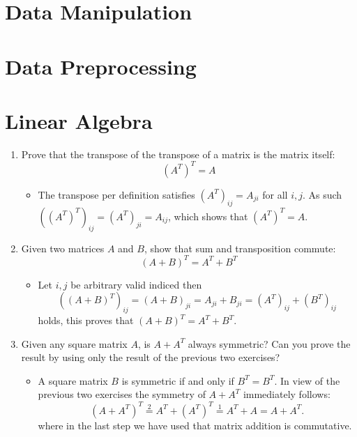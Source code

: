 \documentclass{article}
\begin{document}
\tableofcontents

\section{Data Manipulation}

\section{Data Preprocessing}

\section{Linear Algebra}
\begin{enumerate}
    \item Prove that the transpose of the transpose of a matrix is the matrix itself: \\
    $$(A^T)^T = A$$
    	\begin{itemize}
    		\item The transpose per definition satisfies $(A^T)_{ij} = A_{ji}$ for all $i, j$. As such $((A^T)^T)_{ij} = (A^T)_{ji} = A_{ij}$, which shows that $(A^T)^T = A$.
    	\end{itemize}

    \item Given two matrices $A$ and $B$, show that sum and transposition commute: \\
    $$(A + B)^T = A^T + B^T$$
    	\begin{itemize}
    		\item Let $i, j$ be arbitrary valid indiced then
    		$$((A + B)^T)_{ij} = (A + B)_{ji} = A_{ji} + B_{ji} = (A^T)_{ij} + (B^T)_{ij}$$
    		holds, this proves that $(A + B)^T = A^T + B^T$.
    	\end{itemize}

    \item Given any square matrix $A$, is $A + A^T$ always symmetric? Can you prove the result by using only the result of the previous two exercises?
    	\begin{itemize}
    		\item A square matrix $B$ is symmetric if and only if $B^T = B^T$. In view of the previous two exercises the symmetry of $A + A^T$ immediately follows:
    		$$
    		(A + A^T)^T \overset{2}{=} A^T + (A^T)^T \overset{1}{=} A^T + A = A + A^T.
    		$$ 
    		where in the last step we have used that matrix addition is commutative.
    	\end{itemize}


\end{enumerate}
\end{document}
